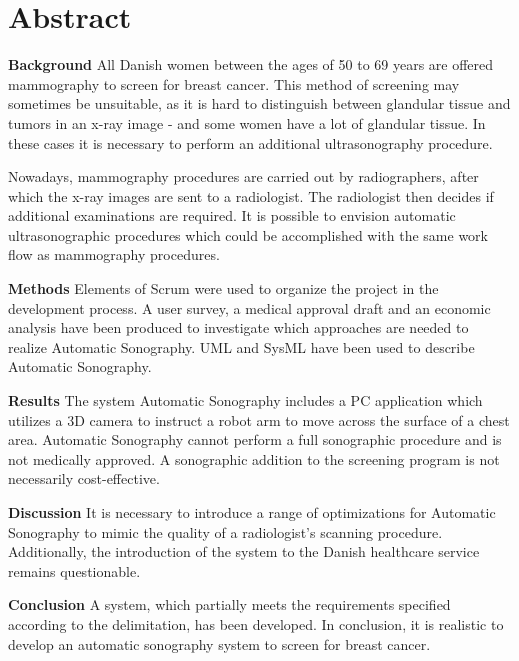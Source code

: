 \chapter{Abstract}\label{kapitel_Abstract}
\textbf{Background} \newline
All Danish women between the ages of 50 to 69 years are offered 
mammography to screen for breast cancer. This method of screening may sometimes be unsuitable, as it is hard to distinguish between glandular tissue and tumors in an x-ray image - and some women have a lot of glandular tissue. In these cases it is necessary to perform an additional ultrasonography procedure.

Nowadays, mammography procedures are carried out by radiographers, after which the x-ray images are sent to a radiologist. The radiologist then decides if additional examinations are required. It is possible to envision automatic ultrasonographic procedures which could be accomplished with the same work flow as mammography procedures.

\textbf{Methods} \newline
Elements of Scrum were used to organize the project in the development process. A user survey, a medical approval draft and an economic analysis have been produced to investigate which approaches are needed to realize Automatic Sonography. UML and SysML have been used to describe Automatic Sonography.

\textbf{Results} \newline
The system Automatic Sonography includes a PC application which utilizes a 3D camera to instruct a robot arm to move across the surface of a chest area. Automatic Sonography cannot perform a full sonographic procedure and is not medically approved. A sonographic addition to the screening program is not necessarily cost-effective.

\textbf{Discussion}\newline
It is necessary to introduce a range of optimizations for Automatic Sonography to mimic the quality of a radiologist's scanning procedure. Additionally, the introduction of the system to the Danish healthcare service remains questionable.

\textbf{Conclusion} \newline
A system, which partially meets the requirements specified according to the delimitation, has been developed. In conclusion, it is realistic to develop an automatic sonography system to screen for breast cancer.